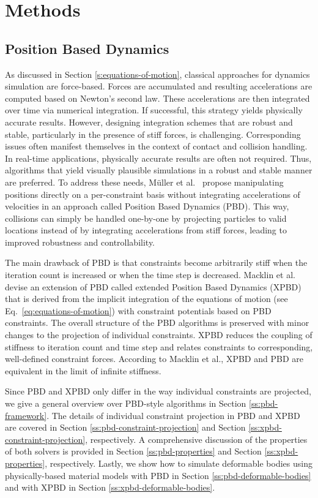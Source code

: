 \chapter{Methods}\label{ch:method}

\section{Position Based Dynamics}\label{s:pbd}
As discussed in Section \ref{s:equations-of-motion}, classical approaches for dynamics simulation are force-based. Forces are accumulated and 
resulting accelerations are computed based on Newton's second law. These accelerations are then integrated over time via numerical integration. 
If successful, this strategy yields physically accurate results. However, designing integration schemes that are robust and stable,
particularly in the presence of stiff forces, is challenging. Corresponding issues often manifest themselves in the context of contact and collision 
handling. In real-time applications, physically accurate results are often not required. Thus, algorithms that yield visually
plausible simulations in a robust and stable manner are preferred. To address these needs, Müller et al.\ \cite{mueller2006} propose manipulating
positions directly on a per-constraint basis without integrating accelerations of velocities in an approach called Position Based Dynamics (PBD).
This way, collisions can simply be handled one-by-one by projecting particles to valid locations instead of by integrating accelerations from 
stiff forces, leading to improved robustness and controllability. 

The main drawback of PBD is that constraints become arbitrarily stiff when the iteration count is increased or when the time step is decreased.
Macklin et al.\ \cite{macklin2016} devise an extension of PBD called extended Position Based Dynamics (XPBD) that is derived from the implicit
integration of the equations of motion (see Eq.\ \ref{eq:equations-of-motion}) with constraint potentials based on PBD constraints. The overall structure 
of the PBD algorithms is preserved with 
minor changes to the projection of individual constraints. XPBD reduces the coupling of stiffness to iteration count and time step and relates 
constraints to corresponding, well-defined constraint forces. According to Macklin et al., XPBD and PBD are equivalent in the limit of infinite
stiffness. 

Since PBD and XPBD only differ in the way individual constraints are projected, we give a general overview over PBD-style algorithms 
in Section \ref{ss:pbd-framework}. 
The details of individual constraint projection in PBD and XPBD are covered in Section \ref{ss:pbd-constraint-projection} and 
Section \ref{ss:xpbd-constraint-projection}, respectively. A comprehensive discussion of the properties of both solvers is provided in 
Section \ref{ss:pbd-properties} and Section \ref{ss:xpbd-properties}, respectively. Lastly, we show how to simulate deformable bodies using physically-based 
material models with PBD in Section \ref{ss:pbd-deformable-bodies} and with XPBD in Section \ref{ss:xpbd-deformable-bodies}.

